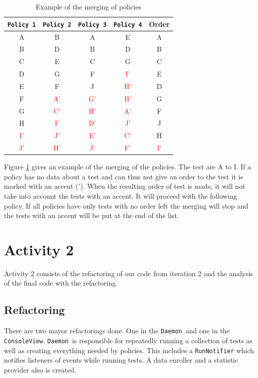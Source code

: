 \documentclass[i3]{oss}
\newcommand{\class}[1]{\texttt{#1}}
\newcommand{\Daemon}{\class{Daemon  }}
\newcommand{\col}[1]{\textcolor{red}{#1}}
\begin{document}
\begin{table}[h!]
\begin{center}
    \begin{tabular}{ c  c  c  c | c}
     \class{Policy 1} & \class{Policy 2} & \class{Policy 3} & \class{Policy 4} & Order  \\ \hline
    	A & B & A & E & A \\
        B & D & B & D & B \\
        C & E & C & G & C\\
        D & G & F & \col{I'} & E \\
        E & F & J & \col{H'} & D \\
        F & \col{A'} & \col{G'} & \col{B'} & G \\
        G & \col{C'} & \col{H'} & \col{A'} & F \\
        H & \col{I'} & \col{D'} & \col{J'} & J \\
        \col{I'} & \col{J'} & \col{E'} & \col{C'} & H \\
        \col{J'} & \col{H'} & \col{J'} & \col{F'} & \col{I'} \\
    \end{tabular}
    \caption{Example of the merging of policies }
    \label{fig:orderex}
    \end{center}
\end{table}

Figure \ref{fig:orderex} gives an example of the merging of the policies. The test are A to I. If a policy has no data about a test and can thus not give an order to the test it is marked with an accent ('). When the resulting order of test is made, it will not take into account the tests with an accent. It will proceed with the following policy. If all policies have only tests with no order left the merging will stop and the tests with an accent will be put at the end of the list.

 

\section{Activity 2}

Activity 2 consists of the refactoring of our code from iteration 2 and the analysis of the final code with the refactoring. 

\subsection{Refactoring}
\label{ss:refactoring}
There are two mayor refactorings done. One in the \Daemon and one in the \class{ConsoleView}. \Daemon is responsible for repeatedly running a collection of tests as well as creating everything needed by policies.
This includes a \class{RunNotifier} which notifies listeners of events while running tests. A data enroller and a statistic provider also is created.
\end{document}

